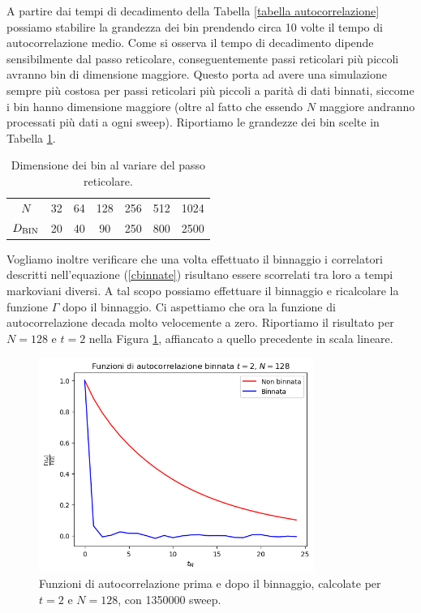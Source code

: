 \documentclass{article}
\begin{document}
A partire dai tempi di decadimento della Tabella \ref{tabella autocorrelazione} possiamo stabilire la grandezza dei bin prendendo circa 10 volte il tempo di autocorrelazione medio. Come si osserva il tempo di decadimento dipende sensibilmente dal passo reticolare, conseguentemente passi reticolari più piccoli avranno bin di dimensione maggiore. Questo porta ad avere una simulazione sempre più costosa per passi reticolari più piccoli a parità di dati binnati, siccome i bin hanno dimensione maggiore (oltre al fatto che essendo $N$ maggiore andranno processati più dati a ogni sweep). Riportiamo le grandezze dei bin scelte in Tabella \ref{tabella D_BIN}. 
\begin{table}[h]
    \centering
    \begin{tabular}{||c||c c c c c c||} 
     \hline
     $N$ & 32 & 64& 128 & 256 & 512 &1024 \\
     $D_{\textup{BIN}}$ & 20 & 40 & 90 & 250 & 800 &2500 \\[1ex] 
     \hline
    \end{tabular}
    \caption{Dimensione dei bin al variare del passo reticolare.}
    \label{tabella D_BIN}
\end{table}

Vogliamo inoltre verificare che una volta effettuato il binnaggio i correlatori descritti nell'equazione (\ref{cbinnate}) risultano essere scorrelati tra loro a tempi markoviani diversi.
A tal scopo possiamo effettuare il binnaggio e ricalcolare la funzione $\Gamma$ dopo il binnaggio. Ci aspettiamo che ora la funzione di autocorrelazione decada molto velocemente a zero. Riportiamo il risultato per $N=128$ e $t=2$ nella Figura \ref{grafico gamma binnata}, affiancato a quello precedente in scala lineare.
\begin{figure}[h]
    \centering
    \includegraphics[width=0.8\textwidth]{images/gammabinnata_t2_N128.png}
    \caption{Funzioni di autocorrelazione prima e dopo il binnaggio, calcolate per $t=2$ e $N=128$, con 1350000 sweep.}
    \label{grafico gamma binnata}
\end{figure}
\end{document}
